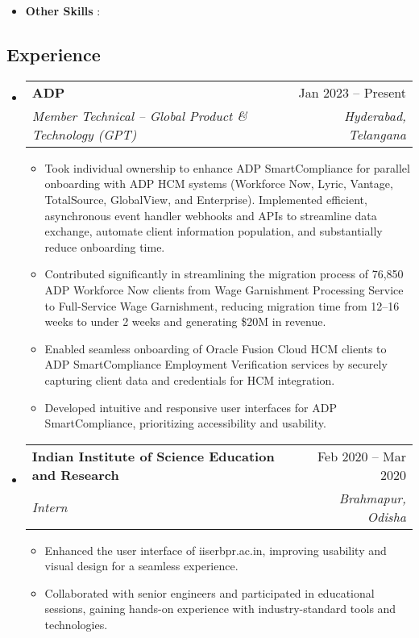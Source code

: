 \documentclass[letterpaper,10pt]{article}
\makeatletter
\newcommand{\resumeItem}[1]{
  \item#1}
\newcommand{\resumeSubheading}[4]{
    \item
    \begin{tabular*}{\textwidth}[t]{l@{\extracolsep{\fill}}r}
      \textbf{#1} & #2 \\
      \textit{#3} & \textit{\small{#4}}
    \end{tabular*}}
\newcommand{\resumeSubHeadingListStart}{\begin{itemize}[label={}, leftmargin=*]}
\newcommand{\resumeSubHeadingListEnd}{\end{itemize}}
\newcommand{\resumeItemListStart}{\begin{itemize}[noitemsep]}
\newcommand{\resumeItemListEnd}{\end{itemize}}
\makeatother
\begin{document}
\begin{itemize}[noitemsep, label={}, leftmargin=*]
{}
        \item{
            \textbf{Other Skills} :
            }
    \end{itemize}
    \subsection{Experience}
    \resumeSubHeadingListStart
        \resumeSubheading
        {ADP}{Jan 2023 -- Present}
        {Member Technical -- Global Product \& Technology (GPT)}{Hyderabad, Telangana}
        \resumeItemListStart
            \resumeItem{Took individual ownership to enhance ADP SmartCompliance for parallel onboarding with ADP HCM systems (Workforce Now, Lyric, Vantage, TotalSource, GlobalView, and Enterprise). Implemented efficient, asynchronous event handler webhooks and APIs to streamline data exchange, automate client information population, and substantially reduce onboarding time.}
            \resumeItem{Contributed significantly in streamlining the migration process of 76,850 ADP Workforce Now clients from Wage Garnishment Processing Service to Full-Service Wage Garnishment, reducing migration time from 12–16 weeks to under 2 weeks and generating \$20M in revenue.}
            \resumeItem{Enabled seamless onboarding of Oracle Fusion Cloud HCM clients to ADP SmartCompliance Employment Verification services by securely capturing client data and credentials for HCM integration.}
            \resumeItem{Developed intuitive and responsive user interfaces for ADP SmartCompliance, prioritizing accessibility and usability.}
        \resumeItemListEnd
        \resumeSubheading
        {Indian Institute of Science Education and Research}{Feb 2020 -- Mar 2020}
        {Intern}{Brahmapur, Odisha}
        \resumeItemListStart
            \resumeItem{Enhanced the user interface of iiserbpr.ac.in, improving usability and visual design for a seamless experience.}
            \resumeItem{Collaborated with senior engineers and participated in educational sessions, gaining hands-on experience with industry-standard tools and technologies.}
        \resumeItemListEnd
    \resumeSubHeadingListEnd
\end{document}

